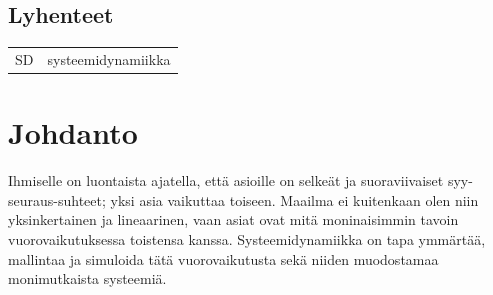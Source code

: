 \documentclass[finnish,12pt,a4paper,pdftex]{article}
\begin{document}
\begin{onehalfspacing} %

\subsection*{Lyhenteet}

\begin{tabular}{ll}
SD         & systeemidynamiikka \\
\end{tabular}


\cleardoublepage
\storeinipagenumber
{}
\setcounter{page}{1}



\section{Johdanto}

\thispagestyle{empty}

Ihmiselle on luontaista ajatella, että asioille on selkeät ja suoraviivaiset syy-seuraus-suhteet; yksi asia vaikuttaa toiseen. Maailma ei kuitenkaan olen niin yksinkertainen ja lineaarinen, vaan asiat ovat mitä moninaisimmin tavoin vuorovaikutuksessa toistensa kanssa. Systeemidynamiikka on tapa ymmärtää, mallintaa ja simuloida tätä vuorovaikutusta sekä niiden muodostamaa monimutkaista systeemiä. 


\end{onehalfspacing}
\end{document}
